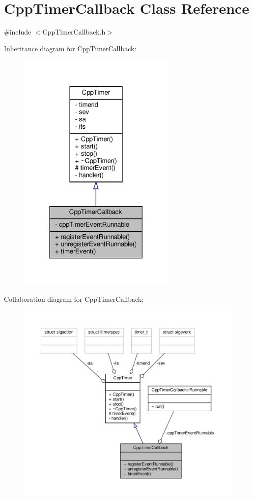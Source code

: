\hypertarget{classCppTimerCallback}{}\section{Cpp\+Timer\+Callback Class Reference}
\label{classCppTimerCallback}


{\ttfamily \#include $<$Cpp\+Timer\+Callback.\+h$>$}



Inheritance diagram for Cpp\+Timer\+Callback\+:\nopagebreak
\begin{figure}[H]
\begin{center}
\leavevmode
\includegraphics[width=221pt]{classCppTimerCallback__inherit__graph}
\end{center}
\end{figure}


Collaboration diagram for Cpp\+Timer\+Callback\+:\nopagebreak
\begin{figure}[H]
\begin{center}
\leavevmode
\includegraphics[width=350pt]{classCppTimerCallback__coll__graph}
\end{center}
\end{figure}
